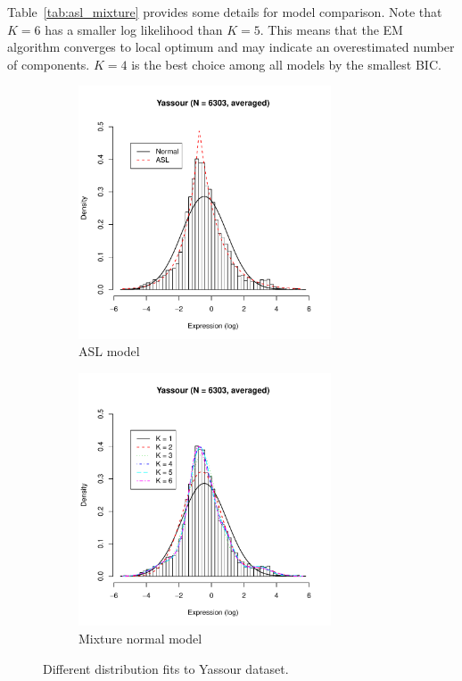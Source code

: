 Table~\ref{tab:asl_mixture}
provides some details for model comparison. Note that $K=6$ has
a smaller log likelihood than $K=5$.  This means that the EM algorithm
converges to local optimum and may indicate an overestimated number of
components. $K = 4$ is the best choice among all models by the smallest
BIC.

\begin{figure}[h]
  \centering
  \begin{subfigure}[b]{.45\textwidth}
    \centering
    \includegraphics[height=7.5cm,width=7.5cm]{cubfits-include/figure/more_asl}
    \caption{ASL model}
    \label{fig:asl}
  \end{subfigure}
  \begin{subfigure}[b]{.45\textwidth}
    \centering
    \includegraphics[height=7.5cm,width=7.5cm]{cubfits-include/figure/more_mixture}
    \caption{Mixture normal model}
    \label{fig:mixture}
  \end{subfigure}
  \caption{Different distribution fits to Yassour dataset.}
  \label{fig:asl_mixture}
\end{figure}

